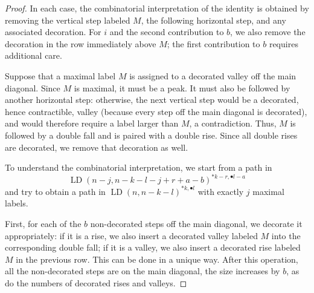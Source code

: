 \documentclass[reqno]{amsart}
\theoremstyle{plain}
\theoremstyle{definition}
\theoremstyle{remark}
\DeclareMathOperator{\LD}{LD}
\newcommand{\<}{\langle}
\renewcommand{\>}{\rangle}
\begin{document}
\begin{proof}
    In each case, the combinatorial interpretation of the identity is obtained by removing the vertical step labeled $M$, the following horizontal step, and any associated decoration. For $i$ and the second contribution to $b$, we also remove the decoration in the row immediately above $M$; the first contribution to $b$ requires additional care.

    Suppose that a maximal label $M$ is assigned to a decorated valley off the main diagonal. Since $M$ is maximal, it must be a peak. It must also be followed by another horizontal step: otherwise, the next vertical step would be a decorated, hence contractible, valley (because every step off the main diagonal is decorated), and would therefore require a label larger than $M$, a contradiction. Thus, $M$ is followed by a double fall and is paired with a double rise. Since all double rises are decorated, we remove that decoration as well.
 
    To understand the combinatorial interpretation, we start from a path in
    \[ \LD(n-j, n-k-l-j+r+a-b)^{\ast k-r, \bullet l-a} \]
    and try to obtain a path in $\LD(n, n-k-l)^{\ast k, \bullet l}$ with exactly $j$ maximal labels.
    
    First, for each of the $b$ non-decorated steps off the main diagonal, we decorate it appropriately: if it is a rise, we also insert a decorated valley labeled $M$ into the corresponding double fall; if it is a valley, we also insert a decorated rise labeled $M$ in the previous row. This can be done in a unique way. After this operation, all the non-decorated steps are on the main diagonal, the size increases by $b$, as do the numbers of decorated rises and valleys.
    

\end{proof}
\end{document}
